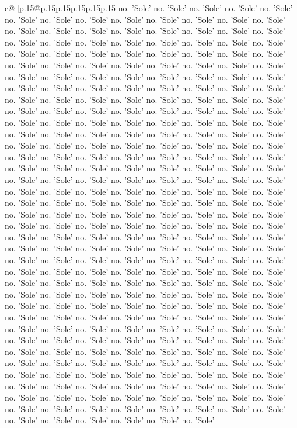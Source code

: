 \documentclass{article}
\begin{document}
{\begin{supertabular}{c@{$\;$}|p{.15\linewidth}@{}p{.15\linewidth}p{.15\linewidth}p{.15\linewidth}p{.15\linewidth}p{.15\linewidth}}
{{{no. 'Sole' no. 'Sole' no. 'Sole' no. 'Sole' no. 'Sole' no. 'Sole' no. 'Sole' no. 'Sole' no. 'Sole' no. 'Sole' no. 'Sole' no. 'Sole' no. 'Sole' no. 'Sole' no. 'Sole' no. 'Sole' no. 'Sole' no. 'Sole' no. 'Sole' no. 'Sole' no. 'Sole' no. 'Sole' no. 'Sole' no. 'Sole' no. 'Sole' no. 'Sole' no. 'Sole' no. 'Sole' no. 'Sole' no. 'Sole' no. 'Sole' no. 'Sole' no. 'Sole' no. 'Sole' no. 'Sole' no. 'Sole' no. 'Sole' no. 'Sole' no. 'Sole' no. 'Sole' no. 'Sole' no. 'Sole' no. 'Sole' no. 'Sole' no. 'Sole' no. 'Sole' no. 'Sole' no. 'Sole' no. 'Sole' no. 'Sole' no. 'Sole' no. 'Sole' no. 'Sole' no. 'Sole' no. 'Sole' no. 'Sole' no. 'Sole' no. 'Sole' no. 'Sole' no. 'Sole' no. 'Sole' no. 'Sole' no. 'Sole' no. 'Sole' no. 'Sole' no. 'Sole' no. 'Sole' no. 'Sole' no. 'Sole' no. 'Sole' no. 'Sole' no. 'Sole' no. 'Sole' no. 'Sole' no. 'Sole' no. 'Sole' no. 'Sole' no. 'Sole' no. 'Sole' no. 'Sole' no. 'Sole' no. 'Sole' no. 'Sole' no. 'Sole' no. 'Sole' no. 'Sole' no. 'Sole' no. 'Sole' no. 'Sole' no. 'Sole' no. 'Sole' no. 'Sole' no. 'Sole' no. 'Sole' no. 'Sole' no. 'Sole' no. 'Sole' no. 'Sole' no. 'Sole' no. 'Sole' no. 'Sole' no. 'Sole' no. 'Sole' no. 'Sole' no. 'Sole' no. 'Sole' no. 'Sole' no. 'Sole' no. 'Sole' no. 'Sole' no. 'Sole' no. 'Sole' no. 'Sole' no. 'Sole' no. 'Sole' no. 'Sole' no. 'Sole' no. 'Sole' no. 'Sole' no. 'Sole' no. 'Sole' no. 'Sole' no. 'Sole' no. 'Sole' no. 'Sole' no. 'Sole' no. 'Sole' no. 'Sole' no. 'Sole' no. 'Sole' no. 'Sole' no. 'Sole' no. 'Sole' no. 'Sole' no. 'Sole' no. 'Sole' no. 'Sole' no. 'Sole' no. 'Sole' no. 'Sole' no. 'Sole' no. 'Sole' no. 'Sole' no. 'Sole' no. 'Sole' no. 'Sole' no. 'Sole' no. 'Sole' no. 'Sole' no. 'Sole' no. 'Sole' no. 'Sole' no. 'Sole' no. 'Sole' no. 'Sole' no. 'Sole' no. 'Sole' no. 'Sole' no. 'Sole' no. 'Sole' no. 'Sole' no. 'Sole' no. 'Sole' no. 'Sole' no. 'Sole' no. 'Sole' no. 'Sole' no. 'Sole' no. 'Sole' no. 'Sole' no. 'Sole' no. 'Sole' no. 'Sole' no. 'Sole' no. 'Sole' no. 'Sole' no. 'Sole' no. 'Sole' no. 'Sole' no. 'Sole' no. 'Sole' no. 'Sole' no. 'Sole' no. 'Sole' no. 'Sole' no. 'Sole' no. 'Sole' no. 'Sole' no. 'Sole' no. 'Sole' no. 'Sole' no. 'Sole' no. 'Sole' no. 'Sole' no. 'Sole' no. 'Sole' no. 'Sole' no. 'Sole' no. 'Sole' no. 'Sole' no. 'Sole' no. 'Sole' no. 'Sole' no. 'Sole' no. 'Sole' no. 'Sole' no. 'Sole' no. 'Sole' no. 'Sole' no. 'Sole' no. 'Sole' no. 'Sole' no. 'Sole' no. 'Sole' no. 'Sole' no. 'Sole' no. 'Sole' no. 'Sole' no. 'Sole' no. 'Sole' no. 'Sole' no. 'Sole' no. 'Sole' no. 'Sole' no. 'Sole' no. 'Sole' no. 'Sole' no. 'Sole' no. 'Sole' no. 'Sole' no. 'Sole' no. 'Sole' no. 'Sole' no. 'Sole' no. 'Sole' no. 'Sole' no. 'Sole' no. 'Sole' no. 'Sole' no. 'Sole' no. 'Sole' no. 'Sole' no. 'Sole' no. 'Sole' no. 'Sole' no. 'Sole' no. 'Sole' no. 'Sole' no. 'Sole' no. 'Sole' no. 'Sole' no. 'Sole' no. 'Sole' no. 'Sole' no. 'Sole' no. 'Sole' no. 'Sole' no. 'Sole' no. 'Sole' no. 'Sole' no. 'Sole' no. 'Sole' no. 'Sole' no. 'Sole' no. 'Sole' no. 'Sole' no. 'Sole' no. 'Sole' no. 'Sole' no. 'Sole' no. 'Sole' no. 'Sole' no. 'Sole' no. 'Sole' no. 'Sole' no. 'Sole' no. 'Sole' no. 'Sole' no. 'Sole' no. 'Sole' no. 'Sole' no. 'Sole' no. 'Sole' no. 'Sole' no. 'Sole' no. 'Sole' no. 'Sole' no. 'Sole' no. 'Sole' no. 'Sole' no. 'Sole' }}}
\end{supertabular}}
\end{document}

